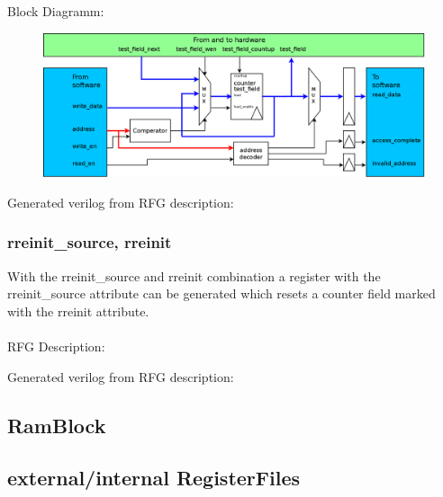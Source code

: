 \documentclass[12pt,a4paper]{article}
\begin{document}
Block Diagramm:
\begin{figure}[h!]
    \includegraphics[width=\textwidth]{pictures/Reg_hrw_srw_counter.png}
\end{figure}
\newpage
Generated verilog from RFG description:

\newpage

\subsubsection{rreinit\_source, rreinit}
With the rreinit\_source and rreinit combination a register with the rreinit\_source attribute can be generated which resets a counter field marked with the rreinit attribute.\\
\\
RFG Description:

\newpage
Generated verilog from RFG description:

\newpage

\subsection{RamBlock}

\subsection{external/internal RegisterFiles}
\end{document}

